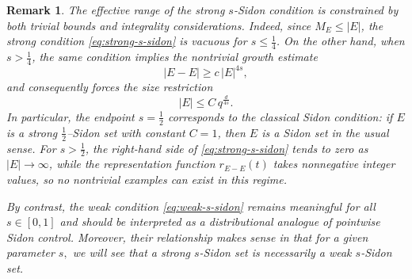 \documentclass{article}
\newtheorem{remark}{Remark}[section]
\begin{document}


\begin{remark}\label{rem:s-sidon-range}
The effective range of the strong $s$-Sidon condition is constrained by both trivial bounds and integrality considerations.
Indeed, since $M_E\le |E|$, the strong condition
\eqref{eq:strong-s-sidon} is vacuous for $s\le \tfrac14$.
On the other hand, when $s>\tfrac14$, the same condition implies the nontrivial growth estimate
\[
|E-E|\ge c\,|E|^{4s},
\]
and consequently forces the size restriction
\[
|E|\le C\,q^{\frac{d}{4s}}.
\]
In particular, the endpoint $s=\tfrac12$ corresponds to the classical Sidon condition: if $E$ is a strong $\tfrac12$--Sidon set with constant $C=1$, then $E$ is a Sidon set in the usual sense.
For $s>\tfrac12$, the right-hand side of \eqref{eq:strong-s-sidon} tends to zero as $|E|\to\infty$, while the representation function $r_{E-E}(t)$ takes nonnegative integer values, so no nontrivial examples can exist in this regime.

By contrast, the weak condition \eqref{eq:weak-s-sidon} remains meaningful for all $s\in[0,1]$ and should be interpreted as a distributional analogue of pointwise Sidon control. 
Moreover, their relationship makes sense in that for a given parameter $s,$ we will see that a strong $s$-Sidon set is necessarily a weak $s$-Sidon set.
\end{remark}







\end{document}
